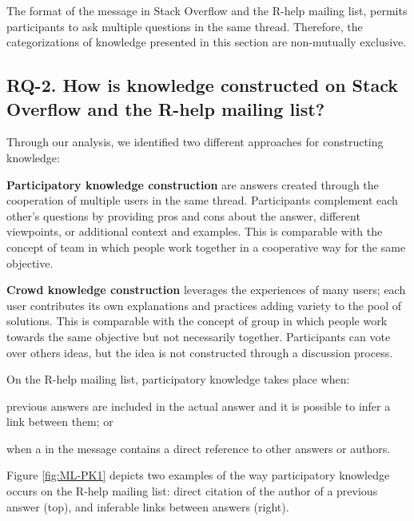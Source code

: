 	The format of the message in Stack Overflow and the R-help mailing list, permits participants to ask multiple questions in the same thread.
	Therefore, the categorizations of knowledge presented in this section are non-mutually exclusive.

\subsection{RQ-2. How is knowledge constructed on Stack Overflow and the R-help mailing list?}
\label{sec:rq2}

    Through our analysis, we identified two different approaches for constructing knowledge:

        \noindent\textbf{Participatory knowledge construction} are answers created through the cooperation of multiple users in the same thread.
        Participants complement each other's questions by providing pros and cons about the answer, different viewpoints, or additional context and examples.
        This is comparable with the concept of team in which people work together in a cooperative way for the same objective.

\noindent        \textbf{Crowd knowledge construction} leverages the experiences of many users; each user contributes its own explanations and practices adding variety to the pool of solutions.
        This is comparable with the concept of group in which people work towards the same objective but not necessarily together.
        Participants can vote over others ideas, but the idea is not constructed through a discussion process.
    
    On the R-help mailing list, participatory knowledge takes place when:
    \begin{enumerate*}[label=(\arabic*)]
    \item previous answers are included in the actual answer and it is possible to infer a link between them; or
    \item when a in the message contains a direct reference to other answers or authors.
    \end{enumerate*}
    Figure \ref{fig:ML-PK1} depicts two examples of the way participatory knowledge occurs on the R-help mailing list:
    direct citation of the author of a previous answer (top), and inferable links between answers (right).

